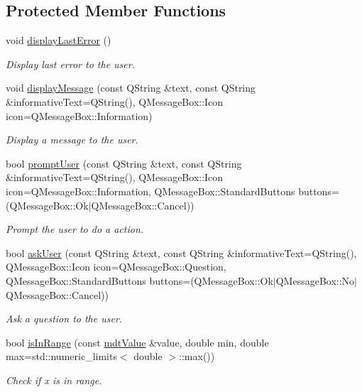 \subsection*{Protected Member Functions}
\begin{DoxyCompactItemize}
\item 
void \hyperlink{classmdt_tt_abstract_test_node_calibration_tool_a4b1c2b5340a0352dde18bf838b378334}{display\-Last\-Error} ()
\begin{DoxyCompactList}\small\item\em Display last error to the user. \end{DoxyCompactList}\item 
void \hyperlink{classmdt_tt_abstract_test_node_calibration_tool_ad5c0a41531d0dbd9c774f59a72664687}{display\-Message} (const Q\-String \&text, const Q\-String \&informative\-Text=Q\-String(), Q\-Message\-Box\-::\-Icon icon=Q\-Message\-Box\-::\-Information)
\begin{DoxyCompactList}\small\item\em Display a message to the user. \end{DoxyCompactList}\item 
bool \hyperlink{classmdt_tt_abstract_test_node_calibration_tool_aaff76264fab90c51317d5491c448ba92}{prompt\-User} (const Q\-String \&text, const Q\-String \&informative\-Text=Q\-String(), Q\-Message\-Box\-::\-Icon icon=Q\-Message\-Box\-::\-Information, Q\-Message\-Box\-::\-Standard\-Buttons buttons=(Q\-Message\-Box\-::\-Ok$|$Q\-Message\-Box\-::\-Cancel))
\begin{DoxyCompactList}\small\item\em Prompt the user to do a action. \end{DoxyCompactList}\item 
bool \hyperlink{classmdt_tt_abstract_test_node_calibration_tool_a464c96ebdb95c0a43fc6684b2b3900f7}{ask\-User} (const Q\-String \&text, const Q\-String \&informative\-Text=Q\-String(), Q\-Message\-Box\-::\-Icon icon=Q\-Message\-Box\-::\-Question, Q\-Message\-Box\-::\-Standard\-Buttons buttons=(Q\-Message\-Box\-::\-Ok$|$Q\-Message\-Box\-::\-No$|$Q\-Message\-Box\-::\-Cancel))
\begin{DoxyCompactList}\small\item\em Ask a question to the user. \end{DoxyCompactList}\item 
bool \hyperlink{classmdt_tt_abstract_test_node_calibration_tool_a056ac13971e84d14bd5bc5106e181baa}{is\-In\-Range} (const \hyperlink{classmdt_value}{mdt\-Value} \&value, double min, double max=std\-::numeric\-\_\-limits$<$ double $>$\-::max())
\begin{DoxyCompactList}\small\item\em Check if x is in range. \end{DoxyCompactList}\end{DoxyCompactItemize}

